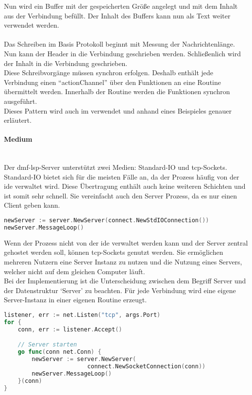 \documentclass[./einleitung.tex]{subfiles}
\begin{document}
    Nun wird ein Buffer mit der gespeicherten Größe angelegt und mit dem Inhalt aus der Verbindung befüllt.
    Der Inhalt des Buffers kann nun als Text weiter verwendet werden.
    \\\\
    Das Schreiben im Basis Protokoll beginnt mit Messung der Nachrichtenlänge.
    Nun kann der Header in die Verbindung geschrieben werden.
    Schließenlich wird der Inhalt in die Verbindung geschrieben.\\
    Diese Schreibvorgänge müssen synchron erfolgen.
    Deshalb enthält jede Verbindung einen ``actionChannel'' über den Funktionen an eine Routine übermittelt werden.
    Innerhalb der Routine werden die Funktionen synchron ausgeführt.\\
    Dieses Pattern wird auch im  verwendet und anhand eines Beispieles genauer erläutert.

    \paragraph{Medium}\mbox{}\\
    Der \acrshort{dmf}-\acrshort{lsp}-Server unterstützt zwei Medien: Standard-IO und \acrshort{tcp}-Sockets.\\
    Standard-IO bietet sich für die meisten Fälle an, da der Prozess häufig von der \acrshort{ide} verwaltet wird.
    Diese Übertragung enthält auch keine weiteren Schichten und ist somit sehr schnell.
    Sie vereinfacht auch den Server Prozess, da es nur einen Client geben kann.
    \begin{lstlisting}[language=Go, caption=Start eines Standard-IO-Servers, label=lst:stdServer]
newServer := server.NewServer(connect.NewStdIOConnection())
newServer.MessageLoop()
    \end{lstlisting}
    Wenn der Prozess nicht von der \acrshort{ide} verwaltet werden kann und der Server zentral gehostet werden soll, können \acrshort{tcp}-Sockets genutzt werden.
    Sie ermöglichen mehreren Nutzern eine Server Instanz zu nutzen und die Nutzung eines Servers, welcher nicht auf dem gleichen Computer läuft.\\
    Bei der Implementierung ist die Unterscheidung zwischen dem Begriff Server und der Datenstruktur `Server' zu beachten.
    Für jede Verbindung wird eine eigene Server-Instanz in einer eigenen Routine erzeugt.
    \begin{lstlisting}[language=Go, caption=Verwaltung des \acrshort{tcp}-Servers, label=lst:tcpServer]
listener, err := net.Listen("tcp", args.Port)
for {
    conn, err := listener.Accept()

    // Server starten
    go func(conn net.Conn) {
        newServer := server.NewServer(
                        connect.NewSocketConnection(conn))
        newServer.MessageLoop()
    }(conn)
}
    \end{lstlisting}
\end{document}
